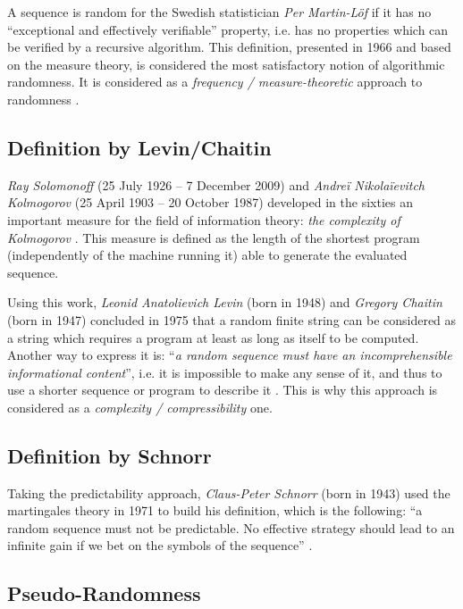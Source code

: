 \documentclass{llncs}
\begin{document}
A sequence is random for the Swedish statistician \emph{Per Martin-L\"{o}f} if it has no ``exceptional and effectively verifiable'' property, i.e. has no properties which can be verified by a recursive algorithm. This definition, presented in 1966 and based on the measure theory, is considered the most satisfactory notion of algorithmic randomness. It is considered as a \textit{frequency / measure-theoretic} approach to randomness \cite{down} \cite{down}.

\subsection{Definition by Levin/Chaitin}

\emph{Ray Solomonoff} (25 July 1926 – 7 December 2009) and \emph{Andreï Nikolaïevitch Kolmogorov} (25 April 1903 – 20 October 1987) developed in the sixties an important measure for the field of information theory: \emph{the complexity of Kolmogorov} \cite{down}. This measure is defined as the length of the shortest program (independently of the machine running it) able to generate the evaluated sequence. 


Using this work, \emph{Leonid Anatolievich Levin} (born in 1948) and \emph{Gregory Chaitin} (born in 1947) concluded in 1975 that a random finite string can be considered as a string which requires a program at least as long as itself to be computed. Another way to express it is: ``\textit{a random sequence must have an incomprehensible informational content}'', i.e. it is impossible to make any sense of it, and thus to use a shorter sequence or program to describe it \cite{down}. This is why this approach is considered as a \textit{complexity / compressibility} one.

\subsection{Definition by Schnorr}

Taking the predictability approach, \emph{Claus-Peter Schnorr} (born in 1943) used the martingales theory in 1971 to build his definition, which is the following: ``a random sequence must not be predictable. No effective strategy should lead to an infinite gain if we bet on the symbols of the sequence'' \cite{down}.



\subsection{Pseudo-Randomness}
\end{document}
